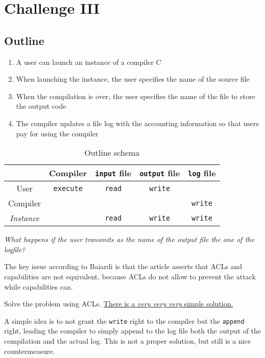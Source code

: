 \chapter{Challenge III}

\section{Outline}
\begin{enumerate}
   \item A user can launch an instance of a compiler C
   \item When launching the instance, the user specifies the name of the
   source file
   \item When the compilation is over, the user specifies the name of the
   file to store the output code
   \item The compiler updates a file log with the accounting information
   so that users pay for using the compiler
\end{enumerate}

\begin{table}[htbp]
   \centering
   \begin{tabular}{c|c|c|c|c|}
      & Compiler & \texttt{input} file & \texttt{output} file &\texttt{log} file\\
      \hline
      User & \texttt{execute} & \texttt{read} & \texttt{write} &\\
      \hline
      Compiler & & & & \texttt{write}\\
      \hline
      \textit{Instance} & & \texttt{read} & \texttt{write} & \texttt{write}\\
   \end{tabular}
   \caption{Outline schema}
   \label{fig:challenge3}
\end{table}
\begin{center}
   \textit{What happens if the user transmits as the name of the output file the one of the logfile?}
\end{center}

The key issue according to Baiardi is that the article asserts that ACLs and capabilities are not equivalent, because ACLs do not allow to prevent the attack while capabilities can.

Solve the problem using ACLs.
\underline{There is a \textit{very very very} simple solution.}

A simple idea is to not grant the \texttt{write} right to the compiler but the \texttt{append} right,
leading the compiler to simply append to the log file both the output of the compilation and the actual log.
This is not a proper solution, but still is a nice countermeasure.